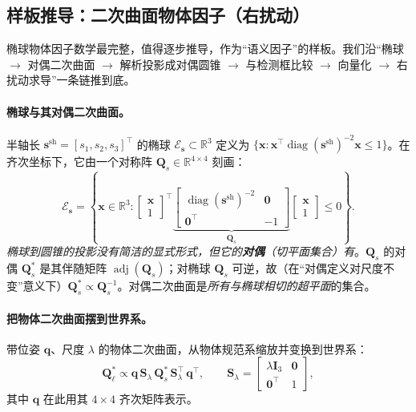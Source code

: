 \subsection{样板推导：二次曲面物体因子（右扰动）}
\label{sec:semantic-object-quadric}

椭球物体因子数学最完整，值得逐步推导，作为“语义因子”的样板。我们沿“椭球 $\to$ 对偶二次曲面 $\to$ 解析投影成对偶圆锥 $\to$ 与检测框比较 $\to$ 向量化 $\to$ 右扰动求导”一条链推到底。

\paragraph{椭球与其对偶二次曲面。}
半轴长 $\mathbf{s}^{\mathrm{sh}}=[s_1,s_2,s_3]^\top$ 的椭球 $\mathcal{E}_{\mathbf{s}}\subset\mathbb{R}^3$ 定义为 $\{\mathbf{x}:\mathbf{x}^\top\operatorname{diag}(\mathbf{s}^{\mathrm{sh}})^{-2}\mathbf{x}\le1\}$。在齐次坐标下，它由一个对称阵 $\mathbf{Q}_s\in\mathbb{R}^{4\times4}$ 刻画：
\begin{equation}
  \mathcal{E}_{\mathbf{s}}=\left\{\mathbf{x}\in\mathbb{R}^3:\begin{bmatrix}\mathbf{x}\\1\end{bmatrix}^\top
  \underbrace{\begin{bmatrix}\operatorname{diag}(\mathbf{s}^{\mathrm{sh}})^{-2}&\mathbf{0}\\\mathbf{0}^\top&-1\end{bmatrix}}_{\mathbf{Q}_s}
  \begin{bmatrix}\mathbf{x}\\1\end{bmatrix}\le0\right\}.
  \label{eq:semantic-quadric-Qs}
\end{equation}
\emph{椭球到圆锥的投影没有简洁的显式形式，但它的\textbf{对偶}（切平面集合）有}\cite{rubino2018quadrics}。$\mathbf{Q}_s$ 的对偶 $\mathbf{Q}_s^{*}$ 是其伴随矩阵 $\operatorname{adj}(\mathbf{Q}_s)$；对椭球 $\mathbf{Q}_s$ 可逆，故（在“对偶定义对尺度不变”意义下）$\mathbf{Q}_s^{*}\propto\mathbf{Q}_s^{-1}$。对偶二次曲面是\emph{所有与椭球相切的超平面}的集合。

\paragraph{把物体二次曲面摆到世界系。}
带位姿 $\mathbf{q}$、尺度 $\lambda$ 的物体二次曲面，从物体规范系缩放并变换到世界系：
\begin{equation}
  \mathbf{Q}_\ell^{*}\propto\mathbf{q}\,\mathbf{S}_\lambda\,\mathbf{Q}_s^{*}\,\mathbf{S}_\lambda^\top\,\mathbf{q}^\top,
  \qquad \mathbf{S}_\lambda=\begin{bmatrix}\lambda\mathbf{I}_3&\mathbf{0}\\\mathbf{0}^\top&1\end{bmatrix},
  \label{eq:semantic-quadric-Ql}
\end{equation}
其中 $\mathbf{q}$ 在此用其 $4\times4$ 齐次矩阵表示\cite{rubino2018quadrics}。

